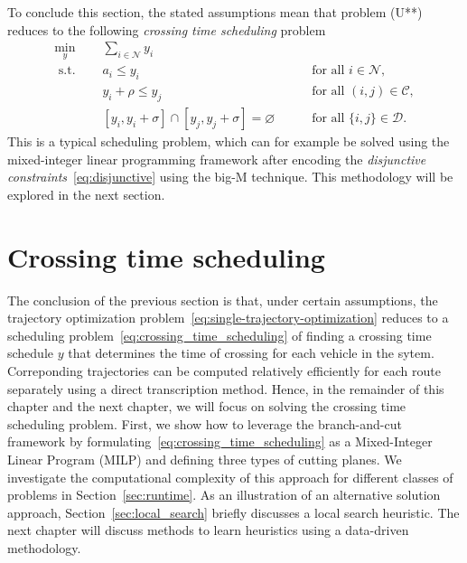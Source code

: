\documentclass[a4paper]{report}
\theoremstyle{definition}
\theoremstyle{plain}
\begin{document}
To conclude this section, the stated assumptions mean that problem (U**) reduces
to the following \textit{crossing time scheduling} problem
\begin{subequations}
\begin{alignat}{2}\label{eq:crossing_time_scheduling}
  \min_{y} \quad & \sum_{i \in \mathcal{N}} y_i \tag{C} \\
  \text{ s.t. } \quad & a_{i} \leq y_i  && \quad \text{ for all } i \in \mathcal{N} , \tag{C.1} \\
                    & y_i + \rho \leq y_{j}  && \quad \text{ for all } (i,j) \in \mathcal{C} \label{eq:conjunctive} , \tag{C.2} \\
                    & [y_{i}, y_i + \sigma] \cap [y_{j}, y_j + \sigma] = \varnothing && \quad \text{ for all } \{i,j\} \in \mathcal{D} \label{eq:disjunctive} \tag{C.3}.
\end{alignat}
\end{subequations}
This is a typical scheduling problem, which can for example be solved using the
mixed-integer linear programming framework after encoding the \textit{disjunctive
  constraints}~\eqref{eq:disjunctive} using the big-M technique. This methodology will be
explored in the next section.


\section{Crossing time scheduling}
\label{sec:branch-and-cut}

The conclusion of the previous section is that, under certain assumptions, the
trajectory optimization problem~\eqref{eq:single-trajectory-optimization}
reduces to a scheduling problem~\eqref{eq:crossing_time_scheduling} of finding a
crossing time schedule $y$ that determines the time of crossing for each vehicle
in the sytem.
%
Correponding trajectories can be computed relatively efficiently for each route separately using a direct transcription method.
%
Hence, in the remainder of this chapter and the next chapter, we will focus on
solving the crossing time scheduling problem.
%
First, we show how to leverage the branch-and-cut framework by
formulating~\eqref{eq:crossing_time_scheduling} as a Mixed-Integer Linear
Program (MILP) and defining three types of cutting planes. We investigate the
computational complexity of this approach for different classes of problems in
Section~\ref{sec:runtime}. As an illustration of an alternative solution approach, Section~\ref{sec:local_search}
briefly discusses a local search heuristic.
%
The next chapter will discuss methods to learn heuristics using a data-driven
methodology.
\end{document}
